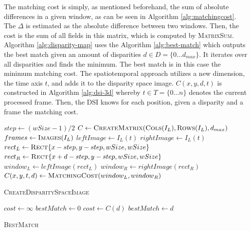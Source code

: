 The matching cost is simply, as mentioned beforehand, the sum of absolute differences in a given window, as can be seen in Algorithm \ref{alg:matchingcost}.
The $\Delta$ is estimated as the absolute difference between two windows.
Then, the cost is the sum of all fields in this matrix, which is computed by \textsc{MatrixSum}.
Algorithm \ref{alg:disparity-map} uses the Algorithm \ref{alg:best-match} which outputs the best match given an amount of disparities $d \in D=\{0{\dots}d_{max}\}$.
It iterates over all disparities and finds the minimum.
The best match is in this case the minimum matching cost.
The spatiotemporal approach utilizes a new dimension, the time axis $t$, and adds it to the disparity space image.
$C(x,y,d,t)$ is constructed in Algorithm \ref{alg:dsi-3d} whereby $t \in T=\{0{\dots}n\}$ denotes the current processed frame.
Then, the DSI knows for each position, given a disparity and a frame the matching cost.

\begin{algorithm}[h!]
\DontPrintSemicolon
{}
$step \gets (wSize - 1) / 2$\;
$C \gets \textsc{CreateMatrix}(\textsc{Cols}(I_L),\textsc{Rows}(I_L),d_{max})$\;
$frames \gets \textsc{Images}(I_L)$\;
 {
  $leftImage \gets I_L(t)$\;
  $rightImage \gets I_L(t)$\;
   {
     {
       {
        $rect_{L} \gets \textsc{Rect}\{x - step, y - step, wSize, wSize\}$\;
        $rect_{R} \gets \textsc{Rect}\{x + d - step, y - step, wSize, wSize\}$\;
        $window_{L} \gets leftImage(rect_{L})$\;
        $window_{R} \gets rightImage(rect_{R})$\;
        $C(x,y,t,d) \gets \textsc{MatchingCost}(window_{L}, window_{R})$\;
      }
    }
  }
}
\;
\caption{\textsc{CreateDisparitySpaceImage}}
\label{alg:dsi-3d}
\end{algorithm}

\begin{algorithm}[h!]
\DontPrintSemicolon
{}
$cost \gets \infty$\;
$bestMatch \gets 0$\;
 {
   {
    $cost \gets C(d)$\;
    $bestMatch \gets d$\;
  }
}
\;
\caption{\textsc{BestMatch}}
\label{alg:best-match}
\end{algorithm}

